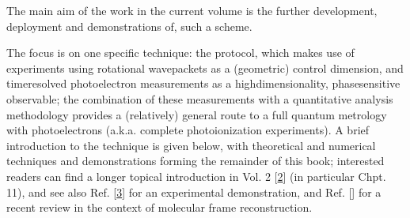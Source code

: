 \documentclass[letterpaper,table,10pt,english]{jupyterBook}
\begin{document}
\sphinxAtStartPar
The main aim of the work in the current volume is the further development, deployment and demonstrations of, such a scheme.

\sphinxAtStartPar
The focus is on one specific  technique: the  protocol, which makes use of experiments using rotational wavepackets as a (geometric) control dimension, and time\sphinxhyphen{}resolved photoelectron measurements as a high\sphinxhyphen{}dimensionality, phase\sphinxhyphen{}sensitive observable; the combination of these measurements with a quantitative analysis methodology provides a (relatively) general route to a full quantum metrology with photoelectrons (a.k.a. complete photoionization experiments). A brief introduction to the technique is given below, with theoretical and numerical techniques and demonstrations forming the remainder of this book; interested readers can find a longer topical introduction in  Vol. 2 {[}\hyperlink{cite.backmatter/bibliography:id614}{2}{]} (in particular Chpt. 11), and see also Ref. {[}\hyperlink{cite.backmatter/bibliography:id702}{3}{]} for an experimental demonstration, and Ref. {[}{]} for a recent review in the context of molecular frame reconstruction.
\end{document}
